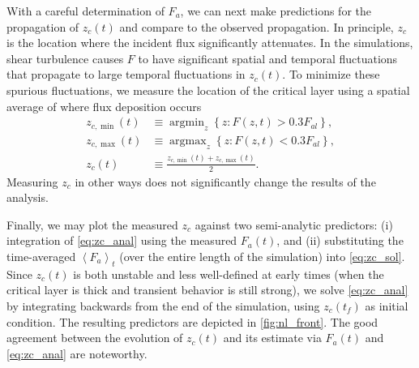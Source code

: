 \documentclass[
        fleqn,
        usenatbib,
        referee,
    ]{mnras}
\newcommand*{\ev}[1]{\left\langle#1\right\rangle}
\newcommand*{\z}[1]{\left\{#1\right\}}
\DeclareMathOperator*{\argmin}{argmin}
\DeclareMathOperator*{\argmax}{argmax}
\begin{document}
With a careful determination of $F_a$, we can next make predictions for the
propagation of $z_c(t)$ and compare to the observed propagation.
In principle, $z_c$ is the location where the incident flux significantly
attenuates. In the simulations, shear turbulence causes $F$ to have significant
spatial and temporal fluctuations that propagate to large temporal fluctuations
in $z_c(t)$. To minimize these spurious fluctuations, we measure the location of
the critical layer using a spatial average of where flux deposition occurs
\begin{align}
    z_{c, \min}(t) &\equiv \argmin_z \z{z: F(z, t) > 0.3F_{al}},\\
    z_{c, \max}(t) &\equiv \argmax_z \z{z: F(z, t) < 0.3F_{al}},\\
    z_c(t) &\equiv \frac{z_{c, \min}(t) + z_{c, \max}(t)}{2}.\label{eq:zc_def}
\end{align}
Measuring $z_c$ in other ways does not significantly change the results of the
analysis.

Finally, we may plot the measured $z_c$ against two semi-analytic predictors:
(i) integration of \autoref{eq:zc_anal} using the measured $F_a(t)$, and
(ii) substituting the time-averaged $\ev{F_a}_t$ (over the entire length of
the simulation) into \autoref{eq:zc_sol}. Since $z_c(t)$ is both unstable and
less well-defined at early times (when the critical layer is thick and transient
behavior is still strong), we solve \autoref{eq:zc_anal} by integrating
backwards from the end of the simulation, using $z_c(t_f)$ as initial condition.
The resulting predictors are depicted in \autoref{fig:nl_front}. The good
agreement between the evolution of $z_c(t)$ and its estimate via $F_a(t)$ and
\autoref{eq:zc_anal} are noteworthy.
\end{document}
